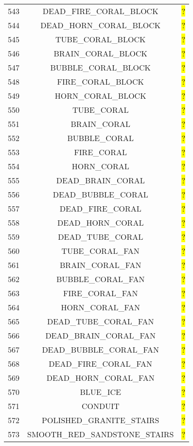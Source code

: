 \documentclass[11pt]{article}
\newcommand\myworries[1]{\sethlcolor{red}\hl{#1}}
\begin{document}
\begin{longtable}{ |c|c|c| }
543 & DEAD\_FIRE\_CORAL\_BLOCK & \myworries{?} \\
544 & DEAD\_HORN\_CORAL\_BLOCK & \myworries{?} \\
545 & TUBE\_CORAL\_BLOCK & \myworries{?} \\
546 & BRAIN\_CORAL\_BLOCK & \myworries{?} \\
547 & BUBBLE\_CORAL\_BLOCK & \myworries{?} \\
548 & FIRE\_CORAL\_BLOCK & \myworries{?} \\
549 & HORN\_CORAL\_BLOCK & \myworries{?} \\
550 & TUBE\_CORAL & \myworries{?} \\
551 & BRAIN\_CORAL & \myworries{?} \\
552 & BUBBLE\_CORAL & \myworries{?} \\
553 & FIRE\_CORAL & \myworries{?} \\
554 & HORN\_CORAL & \myworries{?} \\
555 & DEAD\_BRAIN\_CORAL & \myworries{?} \\
556 & DEAD\_BUBBLE\_CORAL & \myworries{?} \\
557 & DEAD\_FIRE\_CORAL & \myworries{?} \\
558 & DEAD\_HORN\_CORAL & \myworries{?} \\
559 & DEAD\_TUBE\_CORAL & \myworries{?} \\
560 & TUBE\_CORAL\_FAN & \myworries{?} \\
561 & BRAIN\_CORAL\_FAN & \myworries{?} \\
562 & BUBBLE\_CORAL\_FAN & \myworries{?} \\
563 & FIRE\_CORAL\_FAN & \myworries{?} \\
564 & HORN\_CORAL\_FAN & \myworries{?} \\
565 & DEAD\_TUBE\_CORAL\_FAN & \myworries{?} \\
566 & DEAD\_BRAIN\_CORAL\_FAN & \myworries{?} \\
567 & DEAD\_BUBBLE\_CORAL\_FAN & \myworries{?} \\
568 & DEAD\_FIRE\_CORAL\_FAN & \myworries{?} \\
569 & DEAD\_HORN\_CORAL\_FAN & \myworries{?} \\
570 & BLUE\_ICE & \myworries{?} \\
571 & CONDUIT & \myworries{?} \\
572 & POLISHED\_GRANITE\_STAIRS & \myworries{?} \\
573 & SMOOTH\_RED\_SANDSTONE\_STAIRS & \myworries{?} \\

\end{longtable}
\end{document}
